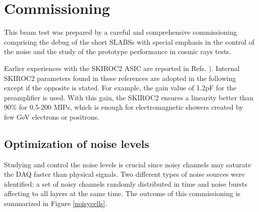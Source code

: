 \documentclass[a4paper,11pt]{article}
\begin{document}
\section{Commissioning}
\label{sec:commissioning}

This beam test was prepared by a careful and comprehensive commissioning comprising
the debug of the
short SLABSs with special emphasis in the control of the noise and the study of the
prototype performance in cosmic rays tests.

Earlier experiences with the SKIROC2 ASIC are reported in Refs. \cite{Amjad:2014tha,Suehara:2018mqk}). 
Internal SKIROC2 parameters found in these references are adopted in the following
except if the opposite is stated.
For example, the gain value of 1.2pF for the preamplifier is used. 
With this gain, the SKIROC2 ensures a linearity better than 90\% 
for 0.5-200 MIPs, which is enough for 
electromagnetic showers created by few GeV 
electrons or positrons.


\subsection{Optimization of noise levels}
\label{sec:comm_noise}

Studying and control the noise levels
is crucial since noisy channels may saturate the DAQ faster than physical signals.
Two different types of noise sources were identified:
a set of noisy channels randomly distributed in time 
and noise bursts affecting to all layers at the same time.
The outcome of this commissioning is summarized in Figure \ref{noisycells}.
\end{document}
